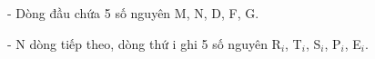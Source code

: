 - Dòng đầu chứa 5 số nguyên M, N, D, F, G.

- N dòng tiếp theo, dòng thứ i ghi 5 số nguyên R$_i$, T$_i$, S$_i$, P$_i$, E$_i$.